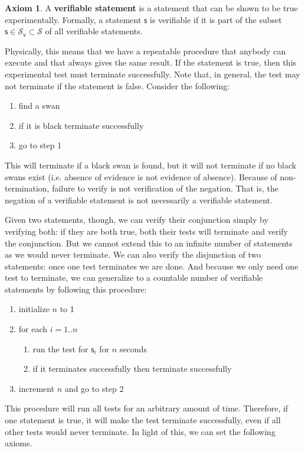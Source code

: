 \documentclass[letterpaper]{article}
\theoremstyle{plain}%
\theoremstyle{definition}
\newtheorem{axiom}[thrm]{Axiom}
\theoremstyle{remark}
\numberwithin{equation}{section}
\def\stmtSet{\mathcal{S}}
\def\vstmtSet{\mathcal{S}_\textsf{v}}
\newcommand{\stmt}[1][s] {\mathsf{#1}}
\begin{document}
\begin{axiom}\label{ax_verifiable_statements}
	A \textbf{verifiable statement} is a statement that can be shown to be true experimentally. Formally, a statement $\stmt$ is verifiable if it is part of the subset $\stmt \in \vstmtSet \subset \stmtSet$ of all verifiable statements.
\end{axiom}

Physically, this means that we have a repeatable procedure that anybody can execute and that always gives the same result. If the statement is true, then this experimental test must terminate successfully. Note that, in general, the test may not terminate if the statement is false. Consider the following:
\begin{enumerate}
	\item find a swan
	\item if it is black terminate successfully
	\item go to step 1
\end{enumerate}
This will terminate if a black swan is found, but it will not terminate if no black swans exist (i.e. absence of evidence is not evidence of absence). Because of non-termination, failure to verify is not verification of the negation. That is, the negation of a verifiable statement is not necessarily a verifiable statement.

Given two statements, though, we can verify their conjunction simply by verifying both: if they are both true, both their tests will terminate and verify the conjunction. But we cannot extend this to an infinite number of statements as we would never terminate. We can also verify the disjunction of two statements: once one test terminates we are done. And because we only need one test to terminate, we can generalize to a countable number of verifiable statements by following this procedure:
\begin{enumerate}
	\item initialize $n$ to 1
	\item for each $i=1..n$
	\begin{enumerate}
		\item run the test for $\stmt_i$ for $n$ seconds
		\item if it terminates successfully then terminate successfully
	\end{enumerate}
	\item increment $n$ and go to step 2
\end{enumerate}
This procedure will run all tests for an arbitrary amount of time. Therefore, if one statement is true, it will make the test terminate successfully, even if all other tests would never terminate. In light of this, we can set the following axioms.
\end{document}
